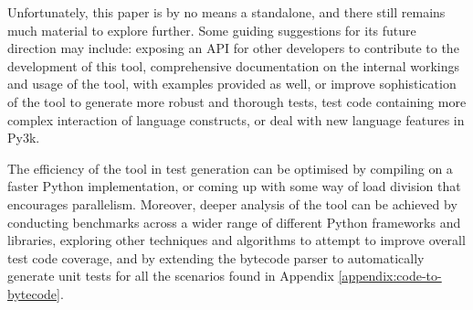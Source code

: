\documentclass{icldt}
\numberwithin{equation}{section}       %
\newcommand{\blankpage}{
\newpage
\thispagestyle{empty}
\mbox{}
\newpage
}
\begin{document}
{{Unfortunately, this paper is by no means a standalone, and there still remains much material to explore further. Some guiding suggestions for its future direction may include: exposing an API for other developers to contribute to the development of this tool, comprehensive documentation on the internal workings and usage of the tool, with examples provided as well, or improve sophistication of the tool to generate more robust and thorough tests, test code containing more complex interaction of language constructs, or deal with new language features in Py3k.

The efficiency of the tool in test generation can be optimised by compiling on a faster Python implementation, or coming up with some way of load division that encourages parallelism. Moreover, deeper analysis of the tool can be achieved by conducting benchmarks across a wider range of different Python frameworks and libraries, exploring other techniques and algorithms to attempt to improve overall test code coverage, and by extending the bytecode parser to automatically generate unit tests for all the scenarios found in Appendix \ref{appendix:code-to-bytecode}.

\blankpage

\nocite{*}

\appendix
}}
\end{document}
